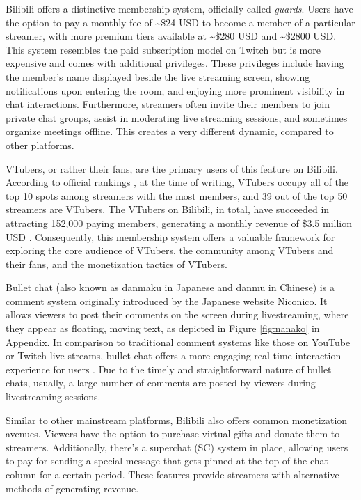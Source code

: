 Bilibili offers a distinctive membership system, officially called \emph{guards}. Users have the option to pay a monthly fee of \textasciitilde\$24 USD to become a member of a particular streamer, with more premium tiers available at \textasciitilde\$280 USD and \textasciitilde\$2800 USD. This system resembles the paid subscription model on Twitch but is more expensive and comes with additional privileges. These privileges include having the member's name displayed beside the live streaming screen, showing notifications upon entering the room, and enjoying more prominent visibility in chat interactions. Furthermore, streamers often invite their members to join private chat groups, assist in moderating live streaming sessions, and sometimes organize meetings offline. This creates a very different dynamic, compared to other platforms.

VTubers, or rather their fans, are the primary users of this feature on Bilibili. According to official rankings \cite{bilibili-membership-ranking}, at the time of writing, VTubers occupy all of the top 10 spots among streamers with the most members, and 39 out of the top 50 streamers are VTubers.
The VTubers on Bilibili, in total, have succeeded in attracting 152,000 paying members, generating a monthly revenue of \$3.5 million USD \cite{vtb-moe}.  
Consequently, this membership system offers a valuable framework for exploring the core audience of VTubers, the community among VTubers and their fans, and the monetization tactics of VTubers.

Bullet chat (also known as danmaku in Japanese and danmu in Chinese) \cite{huang2023} is a comment system originally introduced by the Japanese website Niconico. It allows viewers to post their comments on the screen during livestreaming, where they appear as floating, moving text, as depicted in Figure \ref{fig:nanako} in Appendix. 
In comparison to traditional comment systems like those on YouTube or Twitch live streams, bullet chat offers a more engaging real-time interaction experience for users \cite{huang2023}. Due to the timely and straightforward nature of bullet chats, usually, a large number of comments are posted by viewers during livestreaming sessions.

Similar to other mainstream platforms, Bilibili also offers common monetization avenues. Viewers have the option to purchase virtual gifts and donate them to streamers. Additionally, there's a superchat (SC) system in place, allowing users to pay for sending a special message that gets pinned at the top of the chat column for a certain period. These features provide streamers with alternative methods of generating revenue.